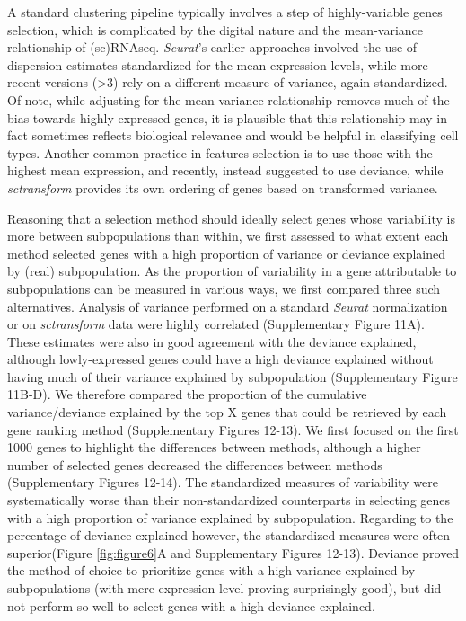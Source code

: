 \documentclass{bmcart}
\begin{document}
A standard clustering pipeline typically involves a step of highly-variable genes selection, which is complicated by the digital nature and the mean-variance relationship of (sc)RNAseq. \textit{Seurat}'s earlier approaches involved the use of dispersion estimates standardized for the mean expression levels, while more recent versions (>3) rely on a different measure of variance, again standardized. Of note, while adjusting for the mean-variance relationship removes much of the bias towards highly-expressed genes, it is plausible that this relationship may in fact sometimes reflects biological relevance and would be helpful in classifying cell types. Another common practice in features selection is to use those with the highest mean expression, and recently, \citep{townesGlmpca2019} instead suggested to use deviance, while \textit{sctransform} provides its own ordering of genes based on transformed variance.

Reasoning that a selection method should ideally select genes whose variability is more between subpopulations than within, we first assessed to what extent each method selected genes with a high proportion of variance or deviance explained by (real) subpopulation. As the proportion of variability in a gene attributable to subpopulations can be measured in various ways, we first compared three such alternatives. Analysis of variance performed on a standard \textit{Seurat} normalization or on \textit{sctransform} data were highly correlated (Supplementary Figure 11A). These estimates were also in good agreement with the deviance explained, although lowly-expressed genes could have a high deviance explained without having much of their variance explained by subpopulation (Supplementary Figure 11B-D). We therefore compared the proportion of the cumulative variance/deviance explained by the top X genes that could be retrieved by each gene ranking method (Supplementary Figures 12-13). We first focused on the first 1000 genes to highlight the differences between methods, although a higher number of selected genes decreased the differences between methods (Supplementary Figures 12-14). The standardized measures of variability were systematically worse than their non-standardized counterparts in selecting genes with a high proportion of variance explained by subpopulation. Regarding to the percentage of deviance explained however, the standardized measures were often superior(Figure \ref{fig:figure6}A and Supplementary Figures 12-13). Deviance proved the method of choice to prioritize genes with a high variance explained by subpopulations (with mere expression level proving surprisingly good), but did not perform so well to select genes with a high deviance explained.
\end{document}
